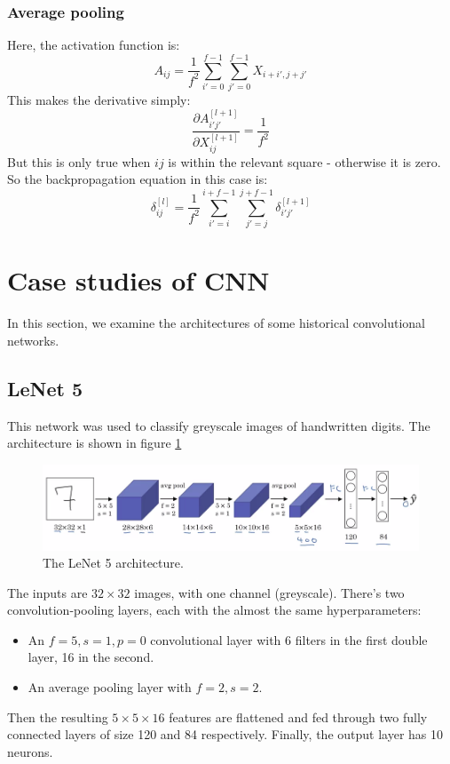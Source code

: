 \documentclass[12pt, a4paper]{article}
\numberwithin{equation}{section}
\begin{document}
\subsubsection{Average pooling}
Here, the activation function is:
\begin{equation}
A_{ij}=\frac{1}{f^2}\sum_{i'=0}^{f-1}\sum_{j'=0}^{f-1}X_{i+i',j+j'}
\end{equation}
This makes the derivative simply:
\begin{equation}
\frac{\partial A^{[l+1]}_{i'j'}}{\partial X^{[l+1]}_{ij}}=\frac{1}{f^2}
\end{equation}
But this is only true when $ij$ is within the relevant square - otherwise it is zero. So the backpropagation equation in this case is:
\begin{equation}
\delta^{[l]}_{ij}=\frac{1}{f^2}\sum_{i'=i}^{i+f-1}\sum_{j'=j}^{j+f-1}\delta^{[l+1]}_{i'j'}
\end{equation}


\section{Case studies of CNN}
In this section, we examine the architectures of some historical convolutional networks.

\subsection{LeNet 5}
This network was used to classify greyscale images of handwritten digits. The architecture is shown in figure \ref{fig:le_net}

\begin{figure}
\centering
\includegraphics[width=\textwidth]{le_net}
\caption{The LeNet 5 architecture.}
\label{fig:le_net}
\end{figure}

The inputs are $32\times 32$ images, with one channel (greyscale). There's two convolution-pooling layers, each with the almost the same hyperparameters:
\begin{itemize}
\item An $f=5, s=1, p=0$ convolutional layer with 6 filters in the first double layer, 16 in the second.
\item An average pooling layer with $f=2, s=2$.
\end{itemize}
Then the resulting $5\times 5\times 16$ features are flattened and fed through two fully connected layers of size 120 and 84 respectively. Finally, the output layer has 10 neurons.
\end{document}
